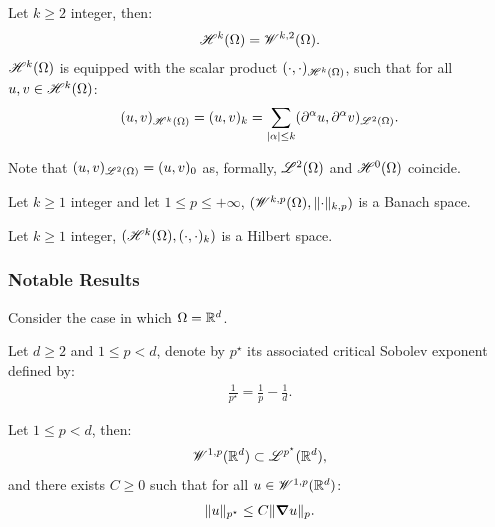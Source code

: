 \begin{definition}
    Let $k \geq 2$ integer, then:
    \begin{gather}
        \mathscr{H}^{k}(\Omega) = \mathscr{W}^{k, 2}(\Omega).
    \end{gather}
    $\mathscr{H}^{k}(\Omega)$ is equipped with the scalar product $(\cdot, \cdot)_{\mathscr{H}^{k}(\Omega)}$, such that for all $u, v \in \mathscr{H}^{k}(\Omega)$:
    \begin{gather}
        (u, v)_{\mathscr{H}^{k}(\Omega)} = (u, v)_k = \sum_{\lvert \alpha \rvert \leq k} (\partial^{\alpha} u, \partial^{\alpha} v)_{\mathscr{L}^{2}(\Omega)}.
    \end{gather}
\end{definition}

Note that $(u, v)_{\mathscr{L}^{2}(\Omega)} = (u, v)_0$ as, formally, $\mathscr{L}^{2}(\Omega)$ and $\mathscr{H}^{0}(\Omega)$ coincide. %

\begin{remark}
    Let $k \geq 1$ integer and let $1 \leq p \leq +\infty$, $(\mathscr{W}^{k, p}(\Omega), \lVert \cdot \rVert_{k, p})$ is a Banach space.
\end{remark}

\begin{remark}
    Let $k \geq 1$ integer, $(\mathscr{H}^{k}(\Omega), (\cdot, \cdot)_k)$ is a Hilbert space.
\end{remark}

\subsubsection{Notable Results}

Consider the case in which $\Omega = \mathbb{R}^{d}$.

\begin{definition}
    Let $d \geq 2$ and $1 \leq p < d$, denote by $p^{\star}$ its associated critical Sobolev exponent defined by:
    \begin{gather}
        \frac{1}{p^{\star}} = \frac{1}{p} - \frac{1}{d}.
    \end{gather}
\end{definition}

\begin{theorem}
    Let $1 \leq p < d$, then:
    \begin{gather}
        \mathscr{W}^{1, p}(\mathbb{R}^{d}) \subset \mathscr{L}^{p^{\star}}(\mathbb{R}^{d}),
    \end{gather}
    and there exists $C \geq 0$ such that for all $u \in \mathscr{W}^{1, p}(\mathbb{R}^{d})$:
    \begin{gather}
        \lVert u \rVert_{p^{\star}} \leq C \lVert \bm{\nabla} u \rVert_p.
    \end{gather}
\end{theorem}

